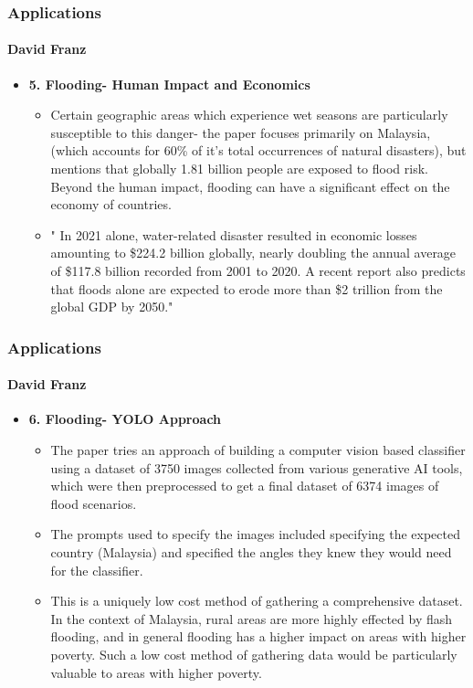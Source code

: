\documentclass{beamer}
\newcommand{\namedframe}[3]{
  \begin{frame}
    \frametitle{#2}
    \framesubtitle{#1}
    #3
  \end{frame}
}
\begin{document}
\namedframe{David Franz}{Applications}{
\begin{itemize}
    \item \textbf{5. Flooding- Human Impact and Economics}
    \begin{itemize}

        \item Certain geographic areas which experience wet seasons are particularly susceptible to this danger- the paper focuses primarily on Malaysia, (which accounts for 60\% of it's total occurrences of natural disasters), but mentions that globally 1.81 billion people are exposed to flood risk. Beyond the human impact, flooding can have a significant effect on the economy of countries.
        \item " In 2021 alone, water-related disaster resulted in economic losses amounting to \$224.2 billion  globally, nearly doubling the annual average of \$117.8 billion recorded from 2001 to 2020. A recent report also predicts that floods alone are expected to erode more than \$2 trillion from the global GDP by 2050."

    \end{itemize}
\end{itemize}
}

\namedframe{David Franz}{Applications}{
\begin{itemize}
    \item \textbf{6. Flooding- YOLO Approach}
    \begin{itemize}
        \item The paper tries an approach of building a computer vision based classifier using a dataset of 3750 images collected from various generative AI tools, which were then preprocessed to get a final dataset of 6374 images of flood scenarios. 
        \item The prompts used to specify the images included specifying the expected country (Malaysia) and specified the angles they knew they would need for the classifier. 
        \item This is a uniquely low cost method of gathering a comprehensive dataset. In the context of Malaysia, rural areas are more highly effected by flash flooding, and in general flooding has a higher impact on areas with higher poverty. Such a low cost method of gathering data would be particularly valuable to areas with higher poverty.
    \end{itemize}
\end{itemize}
}
\end{document}
